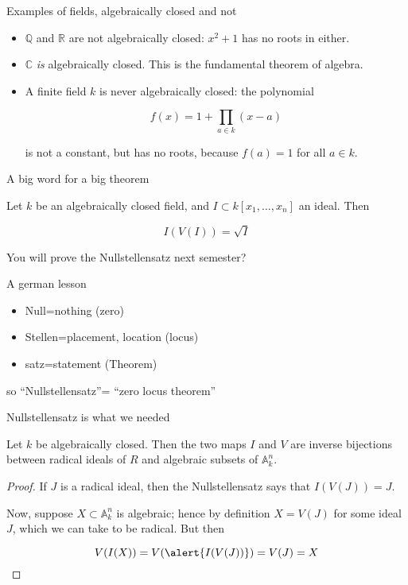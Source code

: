 \documentclass{beamer}
\newcommand{\AAA}{\mathbb{A}}
\newcommand{\C}{\mathbb{C}}
\newcommand{\R}{\mathbb{R}}
\newcommand{\Q}{\mathbb{Q}}
\begin{document}
\begin{frame}{Examples of fields, algebraically closed and not}

\begin{itemize}
\item $\Q$ and $\R$ are \alert{not} algebraically closed: $x^2+1$ has no roots in either.
\item $\C$ \emph{is} algebraically closed.  This is the fundamental theorem of algebra.
\item A finite field $k$ is never algebraically closed: the polynomial

$$f(x)=1+\prod_{a\in k} (x-a)$$

is not a constant, but has no roots, because $f(a)=1$ for all $a\in k$.
\end{itemize}


\end{frame}


\begin{frame}{A big word for a big theorem}

\begin{theorem}
Let $k$ be an algebraically closed field, and $I\subset k[x_1,\dots, x_n]$ an ideal.  Then 

$$I(V(I))=\sqrt{I}$$

\end{theorem}

You will prove the Nullstellensatz next semester?

\begin{block}{A german lesson}
\begin{itemize} 
\item Null=nothing (zero)
\item Stellen=placement, location (locus)
\item satz=statement (Theorem)
\end{itemize}
so ``Nullstellensatz''= ``zero locus theorem''
\end{block}
\end{frame}


\begin{frame}{Nullstellensatz is what we needed}

\begin{theorem} Let $k$ be algebraically closed.  Then the two maps $I$ and $V$ are inverse bijections between radical ideals of $R$ and algebraic subsets of $\AAA_k^n$.
\end{theorem}

\begin{proof}
If $J$ is a radical ideal, then the Nullstellensatz says that $I(V(J))=J$.

Now, suppose $X\subset \AAA^n_k$ is algebraic; hence by definition $X=V(J)$ for some ideal $J$, which we can take to be radical.  But then 

$$V(I(X))=V(\alert{I(V(J))})=V(J)=X$$
\end{proof}
\end{frame}
\end{document}
